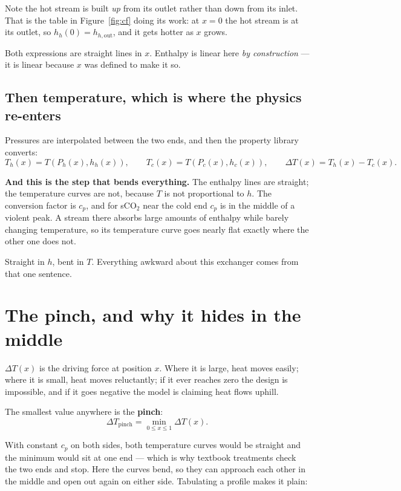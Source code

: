 \documentclass[11pt,a4paper]{report}
\begin{document}
Note the hot stream is built \emph{up} from its outlet rather than down from
its inlet. That is the table in Figure~\ref{fig:cf} doing its work: at $x=0$
the hot stream is at its outlet, so $h_h(0) = h_{h,\mathrm{out}}$, and it
gets hotter as $x$ grows.

Both expressions are straight lines in $x$. Enthalpy is linear here
\emph{by construction} --- it is linear because $x$ was defined to make it
so.

\subsection{Then temperature, which is where the physics re-enters}

Pressures are interpolated between the two ends, and then the property
library converts:
\[
  T_h(x) = T\!\left(P_h(x), h_h(x)\right), \qquad
  T_c(x) = T\!\left(P_c(x), h_c(x)\right), \qquad
  \Delta T(x) = T_h(x) - T_c(x).
\]

\textbf{And this is the step that bends everything.} The enthalpy lines are
straight; the temperature curves are not, because $T$ is not proportional to
$h$. The conversion factor is $c_p$, and for sCO$_2$ near the cold end $c_p$
is in the middle of a violent peak. A stream there absorbs large amounts of
enthalpy while barely changing temperature, so its temperature curve goes
nearly flat exactly where the other one does not.

Straight in $h$, bent in $T$. Everything awkward about this exchanger comes
from that one sentence.

\section{The pinch, and why it hides in the middle}
\label{sec:pinch}

$\Delta T(x)$ is the driving force at position $x$. Where it is large, heat
moves easily; where it is small, heat moves reluctantly; if it ever reaches
zero the design is impossible, and if it goes negative the model is claiming
heat flows uphill.

The smallest value anywhere is the \textbf{pinch}:
\[
  \Delta T_{\mathrm{pinch}} = \min_{0 \le x \le 1} \Delta T(x).
\]

With constant $c_p$ on both sides, both temperature curves would be straight
and the minimum would sit at one end --- which is why textbook treatments
check the two ends and stop. Here the curves bend, so they can approach each
other in the middle and open out again on either side. Tabulating a profile
makes it plain:
\end{document}
